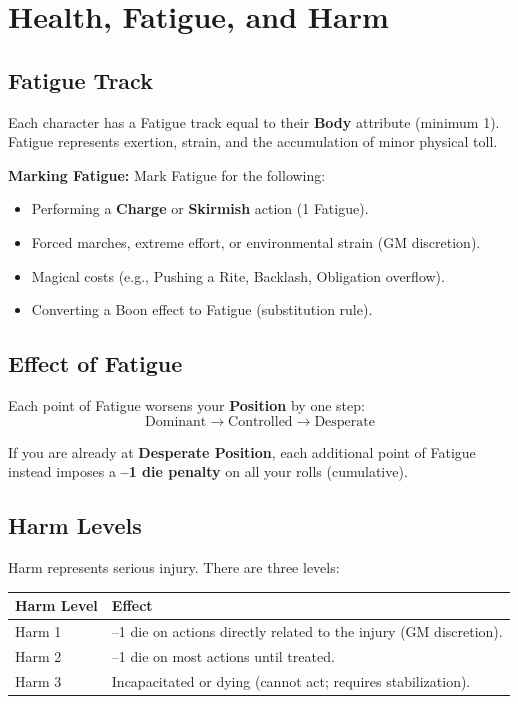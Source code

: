 
\section{Health, Fatigue, and Harm}

\subsection{Fatigue Track}

Each character has a Fatigue track equal to their \textbf{Body} attribute (minimum 1). Fatigue represents exertion, strain, and the accumulation of minor physical toll.

\textbf{Marking Fatigue:} Mark Fatigue for the following:
\begin{itemize}
  \item Performing a \textbf{Charge} or \textbf{Skirmish} action (1 Fatigue).
  \item Forced marches, extreme effort, or environmental strain (GM discretion).
  \item Magical costs (e.g., Pushing a Rite, Backlash, Obligation overflow).
  \item Converting a Boon effect to Fatigue (substitution rule).
\end{itemize}

\subsection{Effect of Fatigue}

Each point of Fatigue worsens your \textbf{Position} by one step:
\[
\text{Dominant} \rightarrow \text{Controlled} \rightarrow \text{Desperate}
\]

If you are already at \textbf{Desperate Position}, each additional point of Fatigue instead imposes a \textbf{--1 die penalty} on all your rolls (cumulative).

\subsection{Harm Levels}

Harm represents serious injury. There are three levels:

\begin{tabular}{@{}ll@{}}
\toprule
\textbf{Harm Level} & \textbf{Effect} \\
\midrule
Harm 1 & --1 die on actions directly related to the injury (GM discretion). \\
Harm 2 & --1 die on most actions until treated. \\
Harm 3 & Incapacitated or dying (cannot act; requires stabilization). \\
\bottomrule
\end{tabular}


